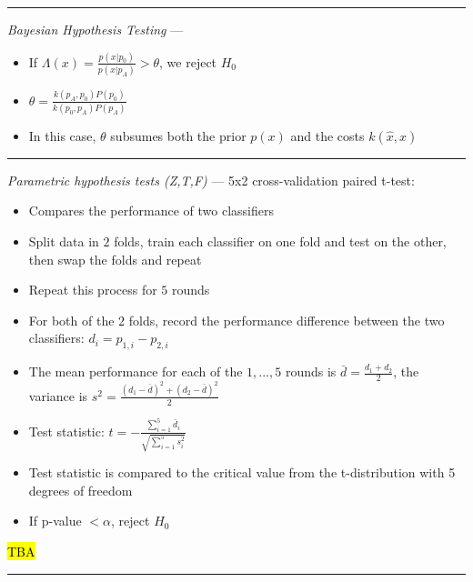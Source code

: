 {\color{lightgray}\hrule height 0.001mm}

\emph{Bayesian Hypothesis Testing} ---
\begin{itemize}
    \item If $\Lambda(x) = \frac{p(x|p_0)}{p(x|p_A)} > \theta$, we reject $H_0$
    \item $\theta = \frac{k(p_A,p_0)P(p_0)}{k(p_0,p_A)P(p_A)}$
    \item In this case, $\theta$ subsumes both the prior $p(x)$ and the costs $k(\hat{x},x)$
\end{itemize}

{\color{lightgray}\hrule height 0.001mm}

\emph{Parametric hypothesis tests (Z,T,F)} --- 
5x2 cross-validation paired t-test:
\begin{itemize}
    \item Compares the performance of two classifiers
    \item Split data in $2$ folds, train each classifier on one fold and test on the other, then swap the folds and repeat
    \item Repeat this process for $5$ rounds
    \item For both of the $2$ folds, record the performance difference between the two classifiers: $d_i = p_{1,i} - p_{2,i}$
    \item The mean performance for each of the $1,...,5$ rounds is $\bar{d} = \frac{d_1+d_2}{2}$, the variance is $s^2 = \frac{(d_1-\bar{d})^2 + (d_2-\bar{d})^2}{2}$
    \item Test statistic: $t = -\frac{\sum_{i=1}^5 \bar{d}_i}{\sqrt{\sum_{i=1}^5 s_i^2}}$
    \item Test statistic is compared to the critical value from the t-distribution with 5 degrees of freedom
    \item If p-value $< \alpha$, reject $H_0$
\end{itemize}
\hl{TBA}

{\color{lightgray}\hrule height 0.001mm}

